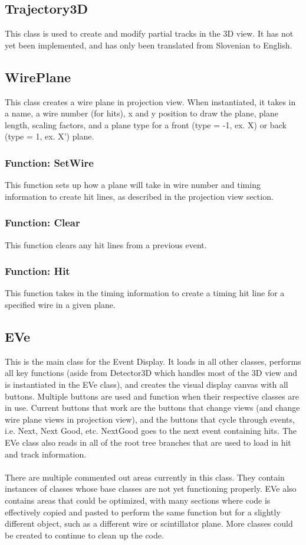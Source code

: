 \documentclass[12pt]{article}
\numberwithin{equation}{section}
\begin{document}
\subsection{Trajectory3D}
This class is used to create and modify partial tracks in the 3D view. It has not yet been implemented, and has only been translated from Slovenian to English.

\subsection{WirePlane}
This class creates a wire plane in projection view. When instantiated, it takes in a name, a wire number (for hits), x and y position to draw the plane, plane length, scaling factors, and a plane type for a front (type = -1, ex. X) or back (type = 1, ex. X') plane.

\subsubsection{Function: SetWire}
This function sets up how a plane will take in wire number and timing information to create hit lines, as described in the projection view section. 

\subsubsection{Function: Clear}
This function clears any hit lines from a previous event.

\subsubsection{Function: Hit}
This function takes in the timing information to create a timing hit line for a specified wire in a given plane. 

\subsection{EVe}
This is the main class for the Event Display. It loads in all other classes, performs all key functions (aside from Detector3D which handles most of the 3D view and is instantiated in the EVe class), and creates the visual display canvas with all buttons. Multiple buttons are used and function when their respective classes are in use. Current buttons that work are the buttons that change views (and change wire plane views in projection view), and the buttons that cycle through events, i.e. Next, Next Good, etc. NextGood goes to the next event containing hits. The EVe class also reads in all of the root tree branches that are used to load in hit and track information.
\\
\\
 There are multiple commented out areas currently in this class. They contain instances of classes whose base classes are not yet functioning properly. EVe also contains areas that could be optimized, with many sections where code is effectively copied and pasted to perform the same function but for a slightly different object, such as a different wire or scintillator plane. More classes could be created to continue to clean up the code.
\end{document}
